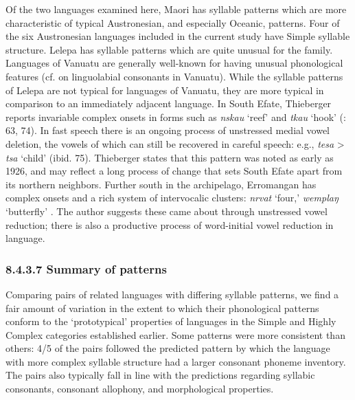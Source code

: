   Of the two languages examined here, Maori has syllable patterns which are more characteristic of typical Austronesian, and especially Oceanic, patterns. Four of the six Austronesian languages included in the current study have Simple syllable structure. Lelepa has syllable patterns which are quite unusual for the family. Languages of Vanuatu are generally well-known for having unusual phonological features (cf. \citealt{Maddieson1989b} on linguolabial consonants in Vanuatu). While the syllable patterns of Lelepa are not typical for languages of Vanuatu, they are more typical in comparison to an immediately adjacent language. In South Efate, Thieberger reports invariable complex onsets in forms such as \textit{nskau} ‘reef’ and \textit{tkau} ‘hook’ (\citealt{Thieberger2004}: 63, 74). In fast speech there is an ongoing process of unstressed medial vowel deletion, the vowels of which can still be recovered in careful speech: e.g., \textit{tesa} > \textit{tsa} ‘child’ (ibid. 75). Thieberger states that this pattern was noted as early as 1926, and may reflect a long process of change that sets South Efate apart from its northern neighbors. Further south in the archipelago, Erromangan has complex onsets and a rich system of intervocalic clusters: \textit{nrvat} ‘four,’ \textit{wemplaŋ} ‘butterfly’ \citep[20-2]{Crowley1998}. The author suggests these came about through unstressed vowel reduction; there is also a productive process of word-initial vowel reduction in language.


\subsubsection{\textbf{8.4.3.7} \textbf{Summary} \textbf{of} \textbf{patterns}}

  Comparing pairs of related languages with differing syllable patterns, we find a fair amount of variation in the extent to which their phonological patterns conform to the ‘prototypical’ properties of languages in the Simple and Highly Complex categories established earlier. Some patterns were more consistent than others: 4/5 of the pairs followed the predicted pattern by which the language with more complex syllable structure had a larger consonant phoneme inventory. The pairs also typically fall in line with the predictions regarding syllabic consonants, consonant allophony, and morphological properties.



